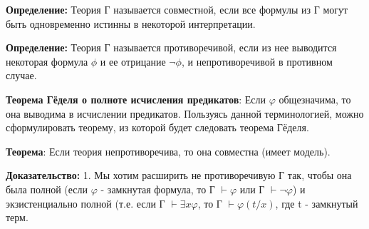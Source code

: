 \textbf{Определение:} Теория Г называется совместной, если все формулы из Г могут быть одновременно истинны в некоторой интерпретации.

\textbf{Определение:} Теория Г называется противоречивой, если из нее выводится некоторая формула $\phi$ и ее отрицание $\neg\phi$, и непротиворечивой в противном случае.

\par
\textbf{Теорема Гёделя о полноте исчисления предикатов}:
Если $\varphi$ общезначима, то она выводима в исчислении предикатов.
Пользуясь данной терминологией, можно сформулировать теорему, из которой будет следовать теорема Гёделя.

\textbf{Теорема}: Если теория непротиворечива, то она совместна (имеет модель).

\textbf{Доказательство:} 1. Мы хотим расширить не противоречивую Г так, чтобы она была полной (если $\varphi$ - замкнутая формула, то Г $ \vdash \varphi$ или  Г $ \vdash \neg \varphi$) и экзистенциально полной (т.е. если Г $ \vdash \exists x \varphi$, то Г $ \vdash \varphi(t/x)$, где t - замкнутый терм.
